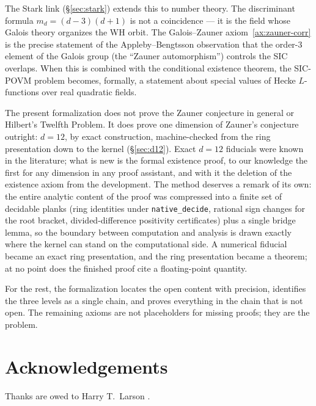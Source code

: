 \documentclass[12pt,a4paper]{article}
\begin{document}
The Stark link (\S\ref{sec:stark}) extends this to number theory.
The discriminant formula $m_d = (d-3)(d+1)$ is not a coincidence --- it is the
field whose Galois theory organizes the WH orbit.  The Galois--Zauner
axiom~\ref{ax:zauner-corr} is the precise statement of the Appleby--Bengtsson
observation that the order-3 element of the Galois group (the ``Zauner
automorphism'') controls the SIC overlaps.  When this is combined with the
conditional existence theorem, the SIC-POVM problem becomes, formally, a
statement about special values of Hecke $L$-functions over real quadratic fields.

The present formalization does not prove the Zauner conjecture in general or
Hilbert's Twelfth Problem.  It does prove one dimension of Zauner's
conjecture outright: $d = 12$, by exact construction, machine-checked from
the ring presentation down to the kernel (\S\ref{sec:d12}).  Exact $d = 12$
fiducials were known in the literature; what is new is the formal existence
proof, to our knowledge the first for any dimension in any proof assistant,
and with it the deletion of the existence axiom from the development.  The
method deserves a remark of its own: the entire analytic content of the
proof was compressed into a finite set of decidable planks (ring identities
under \texttt{native\_decide}, rational sign changes for the root bracket,
divided-difference positivity certificates) plus a single bridge lemma, so
the boundary between computation and analysis is drawn exactly where the
kernel can stand on the computational side.  A numerical fiducial became an
exact ring presentation, and the ring presentation became a theorem; at no
point does the finished proof cite a floating-point quantity.

For the rest, the formalization locates the open content with precision,
identifies the three levels as a single chain, and proves everything in the
chain that is not open.  The remaining axioms are not placeholders for
missing proofs; they are the problem.

\section{Acknowledgements}

Thanks are owed to Harry T.\ Larson \cite{Larson1961}.
\end{document}

